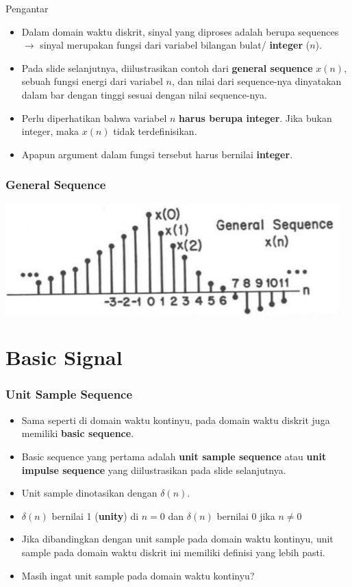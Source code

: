 \documentclass[pdflatex,compress]{beamer}
\begin{document}
\begin{frame}{Pengantar}
	\begin{itemize}
		\item Dalam domain waktu diskrit, sinyal yang diproses adalah berupa sequences $\rightarrow$ sinyal merupakan fungsi dari variabel bilangan bulat/ \textbf{integer} ($ n $).
		\item Pada slide selanjutnya, diilustrasikan contoh dari \textbf{general sequence} $ x(n) $, sebuah fungsi energi dari variabel $ n $, dan nilai dari sequence-nya dinyatakan dalam bar dengan tinggi sesuai dengan nilai sequence-nya.
		\item Perlu diperhatikan bahwa variabel $ n $ \textbf{harus berupa integer}. Jika bukan integer, maka $ x(n) $ tidak terdefinisikan.
		\item Apapun argument dalam fungsi tersebut harus bernilai \textbf{integer}.
	\end{itemize}
\end{frame}

\begin{frame}
	\frametitle{General Sequence}
	\begin{center}
		\includegraphics[width=\linewidth]{img/img001}
	\end{center}
\end{frame}

\section{Basic Signal}
\begin{frame}
	\frametitle{Unit Sample Sequence}
	\begin{itemize}
		\item Sama seperti di domain waktu kontinyu, pada domain waktu diskrit juga memiliki \textbf{basic sequence}.
		\item Basic sequence yang pertama adalah \textbf{unit sample sequence} atau \textbf{unit impulse sequence} yang diilustrasikan pada slide selanjutnya.
		\item Unit sample dinotasikan dengan $ \delta(n) $.
		\item $ \delta(n) $ bernilai 1 (\textbf{unity}) di $ n = 0 $ dan $ \delta(n) $ bernilai 0 jika $n \neq 0$ 
		\item Jika dibandingkan dengan unit sample pada domain waktu kontinyu, unit sample pada domain waktu diskrit ini memiliki definisi yang lebih pasti.
		\item Masih ingat unit sample pada domain waktu kontinyu?
	\end{itemize}
\end{frame}
\end{document}
